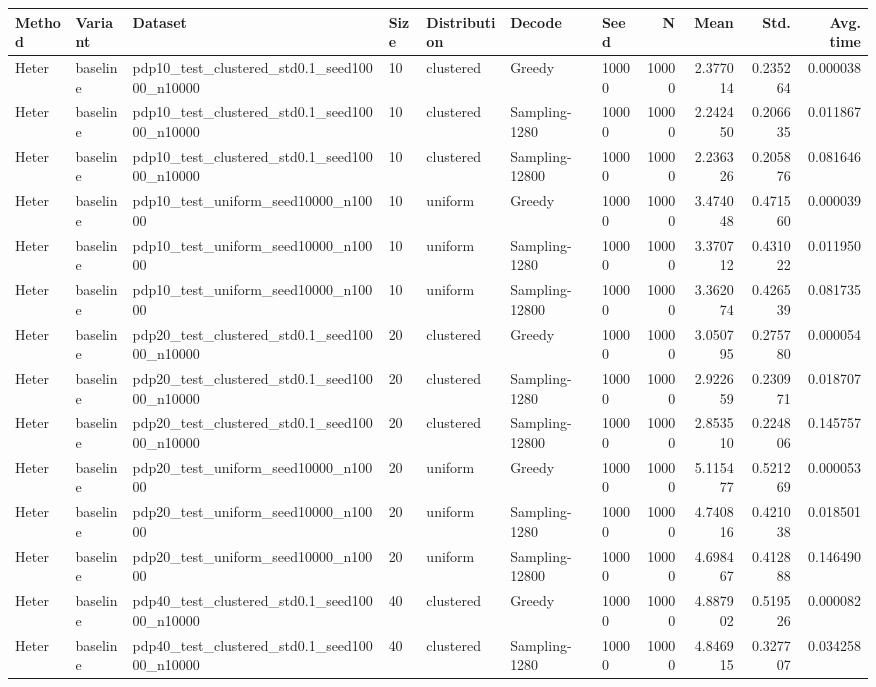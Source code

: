 \begin{tabular}{lllllllrrrr}\toprule
Method & Variant & Dataset & Size & Distribution & Decode & Seed & N & Mean & Std. & Avg. time \\
\midrule
Heter & baseline & pdp10_test_clustered_std0.1_seed10000_n10000 & 10 & clustered & Greedy & 10000 & 10000 & 2.377014 & 0.235264 & 0.000038 \\
Heter & baseline & pdp10_test_clustered_std0.1_seed10000_n10000 & 10 & clustered & Sampling-1280 & 10000 & 10000 & 2.242450 & 0.206635 & 0.011867 \\
Heter & baseline & pdp10_test_clustered_std0.1_seed10000_n10000 & 10 & clustered & Sampling-12800 & 10000 & 10000 & 2.236326 & 0.205876 & 0.081646 \\
Heter & baseline & pdp10_test_uniform_seed10000_n10000 & 10 & uniform & Greedy & 10000 & 10000 & 3.474048 & 0.471560 & 0.000039 \\
Heter & baseline & pdp10_test_uniform_seed10000_n10000 & 10 & uniform & Sampling-1280 & 10000 & 10000 & 3.370712 & 0.431022 & 0.011950 \\
Heter & baseline & pdp10_test_uniform_seed10000_n10000 & 10 & uniform & Sampling-12800 & 10000 & 10000 & 3.362074 & 0.426539 & 0.081735 \\
Heter & baseline & pdp20_test_clustered_std0.1_seed10000_n10000 & 20 & clustered & Greedy & 10000 & 10000 & 3.050795 & 0.275780 & 0.000054 \\
Heter & baseline & pdp20_test_clustered_std0.1_seed10000_n10000 & 20 & clustered & Sampling-1280 & 10000 & 10000 & 2.922659 & 0.230971 & 0.018707 \\
Heter & baseline & pdp20_test_clustered_std0.1_seed10000_n10000 & 20 & clustered & Sampling-12800 & 10000 & 10000 & 2.853510 & 0.224806 & 0.145757 \\
Heter & baseline & pdp20_test_uniform_seed10000_n10000 & 20 & uniform & Greedy & 10000 & 10000 & 5.115477 & 0.521269 & 0.000053 \\
Heter & baseline & pdp20_test_uniform_seed10000_n10000 & 20 & uniform & Sampling-1280 & 10000 & 10000 & 4.740816 & 0.421038 & 0.018501 \\
Heter & baseline & pdp20_test_uniform_seed10000_n10000 & 20 & uniform & Sampling-12800 & 10000 & 10000 & 4.698467 & 0.412888 & 0.146490 \\
Heter & baseline & pdp40_test_clustered_std0.1_seed10000_n10000 & 40 & clustered & Greedy & 10000 & 10000 & 4.887902 & 0.519526 & 0.000082 \\
Heter & baseline & pdp40_test_clustered_std0.1_seed10000_n10000 & 40 & clustered & Sampling-1280 & 10000 & 10000 & 4.846915 & 0.327707 & 0.034258 \\

\end{tabular}
